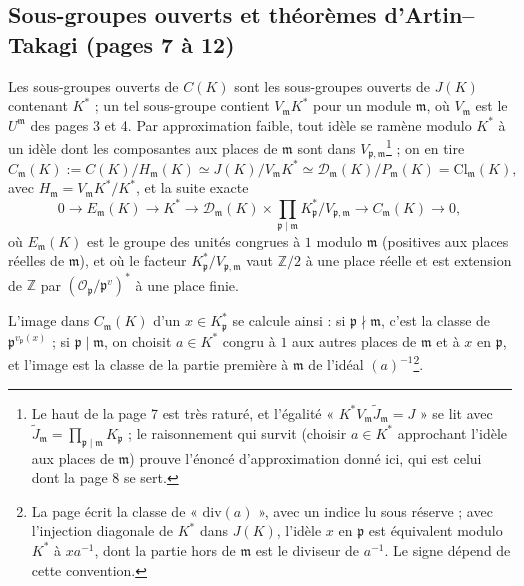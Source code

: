 \documentclass[11pt,a4paper]{article}
\begin{document}
\subsection*{Sous-groupes ouverts et théorèmes d'Artin–Takagi (pages 7 à 12)}

Les sous-groupes ouverts de $C(K)$ sont les sous-groupes ouverts de $J(K)$
contenant $K^{*}$ ; un tel sous-groupe contient $V_{\mathfrak{m}}K^{*}$ pour un
module $\mathfrak{m}$, où $V_{\mathfrak{m}}$ est le $U^{\mathfrak{m}}$ des pages 3
et 4. Par approximation faible, tout idèle se ramène modulo $K^{*}$ à un idèle
dont les composantes aux places de $\mathfrak{m}$ sont dans
$V_{\mathfrak{p},\mathfrak{m}}$\footnote{Le haut de la page 7 est très raturé, et
l'égalité « $K^{*}V_{\mathfrak{m}}\tilde J_{\mathfrak{m}} = J$ » se lit avec
$\tilde J_{\mathfrak{m}} = \prod_{\mathfrak{p}\mid\mathfrak{m}} K_{\mathfrak{p}}$ ;
le raisonnement qui survit (choisir $a \in K^{*}$ approchant l'idèle aux places de
$\mathfrak{m}$) prouve l'énoncé d'approximation donné ici, qui est celui dont la
page 8 se sert.} ; on en tire
\[
C_{\mathfrak{m}}(K) := C(K)/H_{\mathfrak{m}}(K) \simeq J(K)/V_{\mathfrak{m}}K^{*}
\simeq \mathcal{D}_{\mathfrak{m}}(K)/P_{\mathfrak{m}}(K) = \mathrm{Cl}_{\mathfrak{m}}(K),
\]
avec $H_{\mathfrak{m}} = V_{\mathfrak{m}}K^{*}/K^{*}$, et la suite exacte
\[
0 \to E_{\mathfrak{m}}(K) \to K^{*} \to \mathcal{D}_{\mathfrak{m}}(K) \times
\prod_{\mathfrak{p} \mid \mathfrak{m}} K^{*}_{\mathfrak{p}}/V_{\mathfrak{p},\mathfrak{m}}
\to C_{\mathfrak{m}}(K) \to 0,
\]
où $E_{\mathfrak{m}}(K)$ est le groupe des unités congrues à $1$ modulo
$\mathfrak{m}$ (positives aux places réelles de $\mathfrak{m}$), et où le facteur
$K^{*}_{\mathfrak{p}}/V_{\mathfrak{p},\mathfrak{m}}$ vaut $\mathbb{Z}/2$ à une place
réelle et est extension de $\mathbb{Z}$ par $(\mathcal{O}_{\mathfrak{p}}/
\mathfrak{p}^{v})^{*}$ à une place finie.

L'image dans $C_{\mathfrak{m}}(K)$ d'un $x \in K^{*}_{\mathfrak{p}}$ se calcule
ainsi : si $\mathfrak{p} \nmid \mathfrak{m}$, c'est la classe de
$\mathfrak{p}^{v_{\mathfrak{p}}(x)}$ ; si $\mathfrak{p} \mid \mathfrak{m}$, on
choisit $a \in K^{*}$ congru à $1$ aux autres places de $\mathfrak{m}$ et à $x$
en $\mathfrak{p}$, et l'image est la classe de la partie première à
$\mathfrak{m}$ de l'idéal $(a)^{-1}$\footnote{La page écrit la classe de
« $\mathrm{div}(a)$ », avec un indice lu sous réserve ; avec l'injection diagonale
de $K^{*}$ dans $J(K)$, l'idèle $x$ en $\mathfrak{p}$ est équivalent modulo $K^{*}$
à $x a^{-1}$, dont la partie hors de $\mathfrak{m}$ est le diviseur de $a^{-1}$.
Le signe dépend de cette convention.}.
\end{document}
